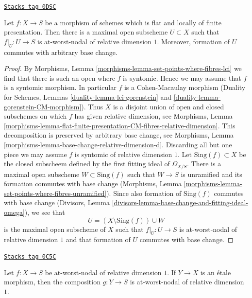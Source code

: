 \begin{lemma}
\label{curves-lemma-locus-where-nodal}
\href{https://stacks.math.columbia.edu/tag/0DSC}{\texttt{Stacks tag 0DSC}}

Let $f : X \to S$ be a morphism of schemes which is flat and
locally of finite presentation. Then there is a maximal open
subscheme $U \subset X$ such that $f|_U : U \to S$ is
at-worst-nodal of relative dimension $1$. Moreover, formation
of $U$ commutes with arbitrary base change.
\end{lemma}

\begin{proof}
By Morphisms, Lemma \ref{morphisms-lemma-set-points-where-fibres-lci}
we find that there is such an open where $f$ is syntomic.
Hence we may assume that $f$ is a syntomic morphism.
In particular $f$ is a Cohen-Macaulay morphism
(Duality for Schemes, Lemmas \ref{duality-lemma-lci-gorenstein} and
\ref{duality-lemma-gorenstein-CM-morphism}).
Thus $X$ is a disjoint union of open and closed subschemes on which
$f$ has given relative dimension, see Morphisms, Lemma
\ref{morphisms-lemma-flat-finite-presentation-CM-fibres-relative-dimension}.
This decomposition is preserved by arbitrary base change, see
Morphisms, Lemma \ref{morphisms-lemma-base-change-relative-dimension-d}.
Discarding all but one piece we may assume $f$ is syntomic of
relative dimension $1$. Let $\text{Sing}(f) \subset X$ be the
closed subscheem defined by the first fitting ideal of
$\Omega_{X/S}$. There is a maximal open subscheme
$W \subset \text{Sing}(f)$ such that $W \to S$ is unramified
and its formation commutes with base change
(Morphisms, Lemma \ref{morphisms-lemma-set-points-where-fibres-unramified}).
Since also formation of $\text{Sing}(f)$ commutes with base change
(Divisors, Lemma
\ref{divisors-lemma-base-change-and-fitting-ideal-omega}),
we see that
$$
U = (X \setminus \text{Sing}(f)) \cup W
$$
is the maximal open subscheme of $X$ such that
$f|_U : U \to S$ is at-worst-nodal of relative dimension $1$
and that formation of $U$ commutes with base change.
\end{proof}

\begin{lemma}
\label{curves-lemma-nodal-family-precompose-etale}
\href{https://stacks.math.columbia.edu/tag/0C5C}{\texttt{Stacks tag 0C5C}}

Let $f : X \to S$ be at-worst-nodal of relative dimension $1$.
If $Y \to X$ is an \'etale morphism, then the composition $g : Y \to S$
is at-worst-nodal of relative dimension $1$.
\end{lemma}

